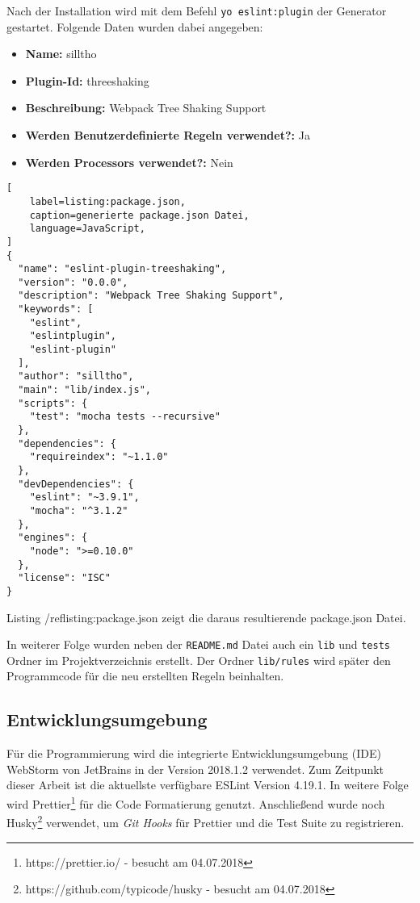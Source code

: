 Nach der Installation wird mit dem Befehl \lstinline{yo eslint:plugin} der Generator gestartet. Folgende Daten wurden dabei angegeben:
\begin{itemize}
	\item \textbf{Name:} silltho
    \item \textbf{Plugin-Id:} threeshaking
    \item \textbf{Beschreibung:} Webpack Tree Shaking Support
    \item \textbf{Werden Benutzerdefinierte Regeln verwendet?:} Ja
    \item \textbf{Werden Processors verwendet?:} Nein
\end{itemize}

\begin{lstlisting}[
    label=listing:package.json,
	caption=generierte package.json Datei,
	language=JavaScript,
]
{
  "name": "eslint-plugin-treeshaking",
  "version": "0.0.0",
  "description": "Webpack Tree Shaking Support",
  "keywords": [
    "eslint",
    "eslintplugin",
    "eslint-plugin"
  ],
  "author": "silltho",
  "main": "lib/index.js",
  "scripts": {
    "test": "mocha tests --recursive"
  },
  "dependencies": {
    "requireindex": "~1.1.0"
  },
  "devDependencies": {
    "eslint": "~3.9.1",
    "mocha": "^3.1.2"
  },
  "engines": {
    "node": ">=0.10.0"
  },
  "license": "ISC"
}
\end{lstlisting}

Listing /ref{listing:package.json} zeigt die daraus resultierende package.json Datei.

In weiterer Folge wurden neben der \lstinline{README.md} Datei auch ein \lstinline{lib} und \lstinline{tests} Ordner im Projektverzeichnis erstellt. Der Ordner \lstinline{lib/rules} wird später den Programmcode für die neu erstellten Regeln beinhalten.

\subsection{Entwicklungsumgebung}
Für die Programmierung wird die integrierte Entwicklungsumgebung (IDE) WebStorm von JetBrains in der Version 2018.1.2 verwendet. Zum Zeitpunkt dieser Arbeit ist die aktuellste verfügbare ESLint Version 4.19.1. In weitere Folge wird Prettier\footnote{https://prettier.io/ - besucht am 04.07.2018} für die Code Formatierung genutzt. Anschließend wurde noch Husky\footnote{https://github.com/typicode/husky - besucht am 04.07.2018} verwendet, um \textit{Git Hooks} für Prettier und die Test Suite zu registrieren.


